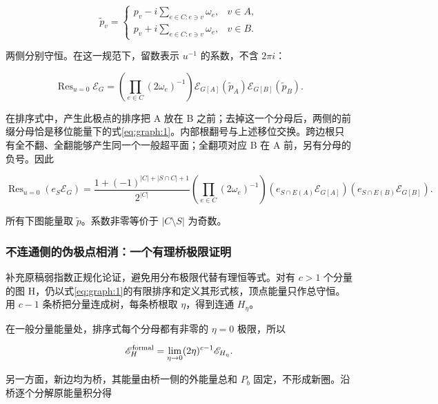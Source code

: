 \documentclass[11pt,a4paper,oneside]{ctexart}
\theoremstyle{cnplain}
\theoremstyle{definition}
\theoremstyle{remark}
\numberwithin{equation}{section}
\begin{document}
\begin{equation}
\widetilde p_v=
 \begin{cases}
 p_v-i\sum_{e\in C:e\ni v}\omega_e,&v\in A,\\
 p_v+i\sum_{e\in C:e\ni v}\omega_e,&v\in B.
 \end{cases}
\end{equation}

两侧分别守恒。在这一规范下，留数表示 \(u^{-1}\) 的系数，不含 \(2\pi i\)：

\begin{equation}
\operatorname{Res}_{u=0}\mathscr E_G
 =\left(\prod_{e\in C}(2\omega_e)^{-1}\right)
   \mathscr E_{G[A]}(\widetilde p_A)
   \mathscr E_{G[B]}(\widetilde p_B).                         \label{eq:graph:3}
\end{equation}

在排序式中，产生此极点的排序把 A 放在 B 之前；去掉这一个分母后，两侧的前缀分母恰是移位能量下的式\eqref{eq:graph:1}。内部根翻号与上述移位交换。跨边根只有全不翻、全翻能够产生同一个一般超平面；全翻项对应 B 在 A 前，另有分母的负号。因此

\begin{equation}
\operatorname{Res}_{u=0}(e_S\mathscr E_G)=
 \frac{1+(-1)^{|C|+|S\cap C|+1}}{2^{|C|}}
 \left(\prod_{e\in C}(2\omega_e)^{-1}\right)
 (e_{S\cap E(A)}\mathscr E_{G[A]})
 (e_{S\cap E(B)}\mathscr E_{G[B]}).                         \label{eq:graph:4}
\end{equation}

所有下图能量取 \(\widetilde p\)。系数非零等价于 \(|C\setminus S|\) 为奇数。

\subsubsection{不连通侧的伪极点相消：一个有理桥极限证明}\label{sec:graph:2.2}

补充原稿弱指数正规化论证，避免用分布极限代替有理恒等式。对有 \(c>1\) 个分量的图 H，仍以式\eqref{eq:graph:1}的有限排序和定义其形式核，顶点能量只作总守恒。用 \(c-1\) 条桥把分量连成树，每条桥根取 \(\eta\)，得到连通 \(H_\eta\)。

在一般分量能量处，排序式每个分母都有非零的 \(\eta=0\) 极限，所以

\begin{equation}
\mathscr E_H^{\rm formal}
 =\lim_{\eta\to0}(2\eta)^{c-1}\mathscr E_{H_\eta}.          \label{eq:graph:5}
\end{equation}

另一方面，新边均为桥，其能量由桥一侧的外能量总和 \(P_b\) 固定，不形成新圈。沿桥逐个分解原能量积分得
\end{document}
